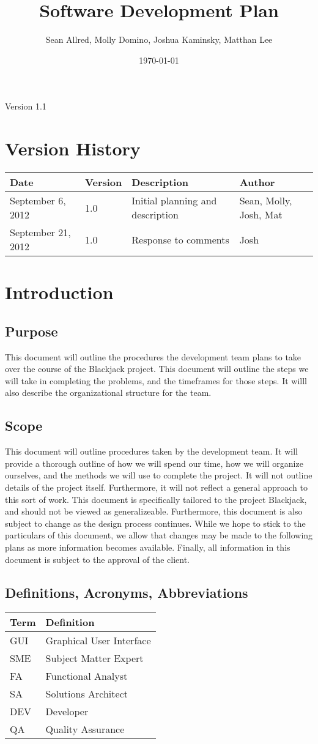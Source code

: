 \documentclass{article}
\title{Software Development Plan}
\author{Sean Allred, Molly Domino, Joshua Kaminsky, Matthan Lee}
\date{\today}
\newcommand{\setupintro}{
  \renewcommand{\thepage}{}
  \maketitle
  \begin{center}
    \large Version 1.1 \normalsize
  \end{center}
  \newpage
  \setcounter{page}{1}
  \renewcommand{\thepage}{\roman{page}}
  \tableofcontents
  \newpage
  \setcounter{page}{1}
  \renewcommand{\thepage}{\arabic{page}}
}
\begin{document}
\setupintro
\section{Version History}
\begin{tabular}{|l|l|l|l|}
\hline
Date & Version & Description & Author \\ \hline
September 6, 2012 & 1.0 & Initial planning and description & Sean, Molly, Josh, Mat\\ \hline
September 21, 2012 & 1.0 & Response to comments & Josh\\ \hline
\end{tabular}
\section{Introduction}
\subsection{Purpose}
This document will outline the procedures the development team plans to take over the course of the Blackjack project. This document will outline the steps we will take in completing the problems, and the timeframes for those steps. It willl also describe the organizational structure for the team.
\subsection{Scope}
This document will outline procedures taken by the development team. It will provide a thorough outline of how we will spend our time, how we will organize ourselves, and the methods we will use to complete the project. It will not outline details of the project itself. Furthermore, it will not reflect a general approach to this sort of work. This document is specifically tailored to the project Blackjack, and should not be viewed as generalizeable. Furthermore, this document is also subject to change as the design process continues. While we hope to stick to the particulars of this document, we allow that changes may be made to the following plans as more information becomes available. Finally, all information in this document is subject to the approval of the client.
\subsection{Definitions, Acronyms, Abbreviations}\label{Terms}
\begin{tabular}{|l|l|}
\hline
Term & Definition \\ \hline
GUI & Graphical User Interface\\ \hline
SME & Subject Matter Expert\\ \hline
FA & Functional Analyst\\ \hline
SA & Solutions Architect\\ \hline
DEV & Developer \\ \hline
QA & Quality Assurance \\ \hline
\end{tabular}
\end{document}
